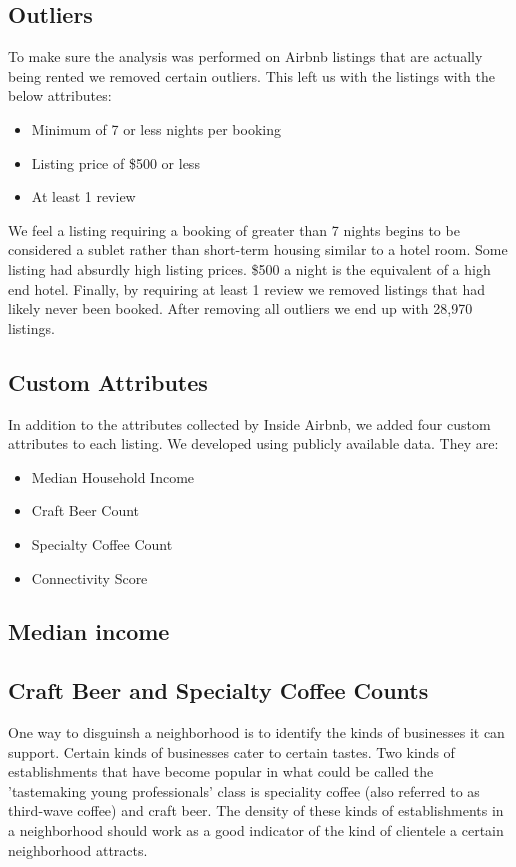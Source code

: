 \documentclass[conference]{IEEEtran}
\begin{document}
\subsection{Outliers}
To make sure the analysis was performed on Airbnb listings that are actually being rented we
removed certain outliers. This left us with the listings with the below attributes:

\begin{itemize}
  \item Minimum of 7 or less nights per booking
  \item Listing price of \$500 or less
  \item At least 1 review
\end{itemize}

We feel a listing requiring a booking of greater than 7 nights begins to be considered a sublet rather
than short-term housing similar to a hotel room. Some listing had absurdly high listing prices. \$500 a night
is the equivalent of a high end hotel. Finally, by requiring at least 1 review we removed
listings that had likely never been booked. After removing all outliers we end up with
28,970 listings.

\subsection{Custom Attributes}
In addition to the attributes collected by Inside Airbnb, we added four custom attributes to each listing.
We developed using publicly available data. They are:

\begin{itemize}
  \item Median Household Income
  \item Craft Beer Count
  \item Specialty Coffee Count
  \item Connectivity Score
\end{itemize}

\subsection{Median income}

\subsection{Craft Beer and Specialty Coffee Counts}
One way to disguinsh a neighborhood is to identify the kinds of businesses it can support.
Certain kinds of businesses cater to certain tastes. Two kinds of establishments that have
become popular in what could be called the 'tastemaking young professionals' class is
speciality coffee (also referred to as third-wave coffee) and craft beer. The density
of these kinds of establishments in a neighborhood should work as a good indicator of
the kind of clientele a certain neighborhood attracts.
\end{document}
